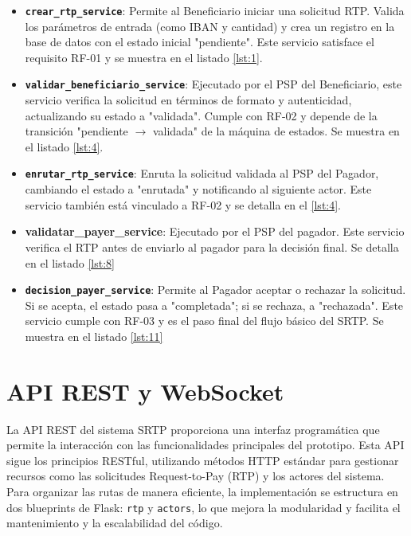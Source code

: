 \begin{itemize}
    \item \textbf{\texttt{crear\_rtp\_service}}: Permite al Beneficiario iniciar una solicitud RTP. Valida los parámetros de entrada (como IBAN y cantidad) y crea un registro en la base de datos con el estado inicial "pendiente". Este servicio satisface el requisito RF-01 y se muestra en el listado \ref{lst:1}.
    \item \textbf{\texttt{validar\_beneficiario\_service}}: Ejecutado por el PSP del Beneficiario, este servicio verifica la solicitud en términos de formato y autenticidad, actualizando su estado a "validada". Cumple con RF-02 y depende de la transición "pendiente $\rightarrow$ validada" de la máquina de estados. Se muestra en el listado \ref{lst:4}.
    \item \textbf{\texttt{enrutar\_rtp\_service}}: Enruta la solicitud validada al PSP del Pagador, cambiando el estado a "enrutada" y notificando al siguiente actor. Este servicio también está vinculado a RF-02 y se detalla en el \ref{lst:4}.
    \item \textbf{\textbf{validatar\_payer\_service}}: Ejecutado por el PSP del pagador. Este servicio verifica el RTP antes de enviarlo al pagador para la decisión final. Se detalla en el listado \ref{lst:8}
    \item \textbf{\texttt{decision\_payer\_service}}: Permite al Pagador aceptar o rechazar la solicitud. Si se acepta, el estado pasa a "completada"; si se rechaza, a "rechazada". Este servicio cumple con RF-03 y es el paso final del flujo básico del SRTP. Se muestra en el listado \ref{lst:11}
\end{itemize}

\section{API REST y WebSocket}
\label{subsec:api_ws}

La API REST del sistema SRTP proporciona una interfaz programática que permite la interacción con las funcionalidades principales del prototipo. Esta API sigue los principios RESTful, utilizando métodos HTTP estándar para gestionar recursos como las solicitudes Request-to-Pay (RTP) y los actores del sistema. Para organizar las rutas de manera eficiente, la implementación se estructura en dos blueprints de Flask: \texttt{rtp} y \texttt{actors}, lo que mejora la modularidad y facilita el mantenimiento y la escalabilidad del código.

